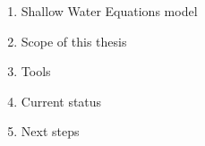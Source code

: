 





\begin{frame}

    \begin{enumerate}
    \item Shallow Water Equations model \vspace{0.5cm}
    \item Scope of this thesis\vspace{0.5cm}
    \item Tools\vspace{0.5cm}
    \item Current status\vspace{0.5cm}
    \item Next steps
    \end{enumerate}



\end{frame}
\clearpage


